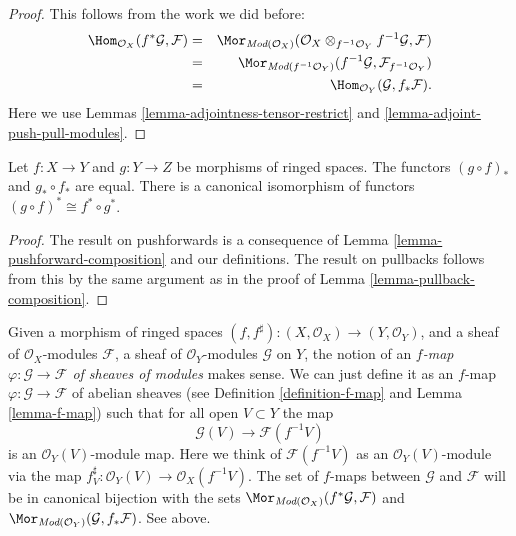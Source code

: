 \begin{proof}
This follows from the work we did before:
\begin{eqnarray*}
\Hom_{\mathcal{O}_X}(f^*\mathcal{G}, \mathcal{F})
& = &
\Mor_{\textit{Mod}(\mathcal{O}_X)}(
\mathcal{O}_X \otimes_{f^{-1}\mathcal{O}_Y} f^{-1}\mathcal{G}, \mathcal{F}) \\
& = &
\Mor_{\textit{Mod}(f^{-1}\mathcal{O}_Y)}(
f^{-1}\mathcal{G}, \mathcal{F}_{f^{-1}\mathcal{O}_Y}) \\
& = &
\Hom_{\mathcal{O}_Y}(\mathcal{G}, f_*\mathcal{F}).
\end{eqnarray*}
Here we use Lemmas \ref{lemma-adjointness-tensor-restrict}
and \ref{lemma-adjoint-push-pull-modules}.
\end{proof}

\begin{lemma}
\label{lemma-push-pull-composition-modules}
Let $f : X \to Y$ and $g : Y \to Z$ be morphisms of ringed spaces.
The functors $(g \circ f)_*$ and $g_* \circ f_*$ are equal.
There is a canonical isomorphism of functors
$(g \circ f)^* \cong f^* \circ g^*$.
\end{lemma}

\begin{proof}
The result on pushforwards is a consequence of Lemma
\ref{lemma-pushforward-composition} and our definitions.
The result on pullbacks follows from this by the same
argument as in the proof of Lemma \ref{lemma-pullback-composition}.
\end{proof}


\noindent
Given a morphism of ringed spaces
$(f, f^\sharp) : (X, \mathcal{O}_X) \to (Y, \mathcal{O}_Y)$,
and a sheaf of $\mathcal{O}_X$-modules $\mathcal{F}$,
a sheaf of $\mathcal{O}_Y$-modules $\mathcal{G}$ on $Y$,
the notion of an {\it $f$-map $\varphi : \mathcal{G} \to \mathcal{F}$
of sheaves of modules} makes sense. We can just define
it as an $f$-map $\varphi : \mathcal{G} \to \mathcal{F}$
of abelian sheaves (see Definition \ref{definition-f-map} and
Lemma \ref{lemma-f-map}) such that for all open $V \subset Y$ the map
$$
\mathcal{G}(V) \longrightarrow \mathcal{F}(f^{-1}V)
$$
is an $\mathcal{O}_Y(V)$-module map. Here we think of
$\mathcal{F}(f^{-1}V)$ as an $\mathcal{O}_Y(V)$-module
via the map $f^\sharp_V : \mathcal{O}_Y(V) \to \mathcal{O}_X(f^{-1}V)$.
The set of $f$-maps between
$\mathcal{G}$ and $\mathcal{F}$ will be in canonical bijection
with the sets
$\Mor_{\textit{Mod}(\mathcal{O}_X)}(f^*\mathcal{G}, \mathcal{F})$
and
$\Mor_{\textit{Mod}(\mathcal{O}_Y)}(\mathcal{G}, f_*\mathcal{F})$.
See above.

